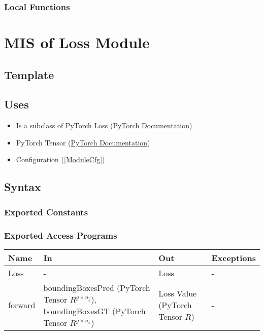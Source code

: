 \documentclass[12pt, titlepage]{article}
\begin{document}
\subsubsection{Local Functions}


\newpage

\section{MIS of Loss Module} \label{ModuleLoss} 

\subsection{Template}



\subsection{Uses}

\begin{itemize}
  \item Is a subclass of PyTorch Loss (\href{https://pytorch.org/docs/stable/nn.html#loss-functions}{PyTorch Documentation})
  \item PyTorch Tensor (\href{https://pytorch.org/docs/stable/tensors.html}{PyTorch Documentation})
  \item Configuration (\ref{ModuleCfg})
\end{itemize}

\subsection{Syntax}



\subsubsection{Exported Constants}



\subsubsection{Exported Access Programs}

\begin{center}
\begin{tabular}{p{2cm}|p{6cm}|p{4cm}|p{2cm}}
\hline
\textbf{Name} & \textbf{In} & \textbf{Out} & \textbf{Exceptions} \\
\hline
Loss & - & Loss & - \\
\hline
forward & boundingBoxesPred (PyTorch Tensor $R^{g\times{}n_{\hat{b}}}$), boundingBoxesGT (PyTorch Tensor $R^{g\times{}n_{b}}$) & Loss Value (PyTorch Tensor $R$) & - \\
\hline
\end{tabular}
\end{center}
\end{document}
